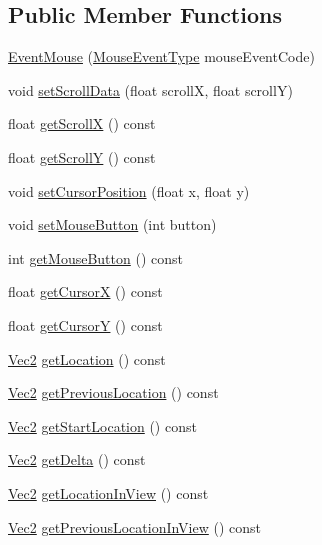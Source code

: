 \subsection*{Public Member Functions}
\begin{DoxyCompactItemize}
\item 
\hyperlink{classEventMouse_a7b964fea12b1e49f3fd13852be60d841}{Event\+Mouse} (\hyperlink{classEventMouse_a6a96ce5df8674cbaf01b74d2f17f213c}{Mouse\+Event\+Type} mouse\+Event\+Code)
\item 
void \hyperlink{classEventMouse_a8fb8c094794f11764abac87bb336e2a7}{set\+Scroll\+Data} (float scrollX, float scrollY)
\item 
float \hyperlink{classEventMouse_a6bca76b62d710a7eadfea9d38ef83597}{get\+ScrollX} () const
\item 
float \hyperlink{classEventMouse_ad0670c5295d1972f2b9ccb85d9d23849}{get\+ScrollY} () const
\item 
void \hyperlink{classEventMouse_ae379cb198545104ef7c79a6599213f99}{set\+Cursor\+Position} (float x, float y)
\item 
void \hyperlink{classEventMouse_ad260eadf10819c3933dc2622952e83a3}{set\+Mouse\+Button} (int button)
\item 
int \hyperlink{classEventMouse_ac1f35c4723f32dbe0c8ccfcb8cc74e54}{get\+Mouse\+Button} () const
\item 
float \hyperlink{classEventMouse_a27e8c8d55e83a9ddbdd7bffcf7c865b5}{get\+CursorX} () const
\item 
float \hyperlink{classEventMouse_af63042e92d51480cdc990360eb4e1166}{get\+CursorY} () const
\item 
\hyperlink{classVec2}{Vec2} \hyperlink{classEventMouse_a3ee0ff253fcf6914a5fdeb9b5c18f2b2}{get\+Location} () const
\item 
\hyperlink{classVec2}{Vec2} \hyperlink{classEventMouse_a3efc2e751febf59f3068305f90cb1acc}{get\+Previous\+Location} () const
\item 
\hyperlink{classVec2}{Vec2} \hyperlink{classEventMouse_a9fdfb69f542e2f9e879db6552e8f656a}{get\+Start\+Location} () const
\item 
\hyperlink{classVec2}{Vec2} \hyperlink{classEventMouse_abda7f9a6569febd5041d4efd7fca35e6}{get\+Delta} () const
\item 
\hyperlink{classVec2}{Vec2} \hyperlink{classEventMouse_ae349cda326d1f48848a8b8f161fe66ed}{get\+Location\+In\+View} () const
\item 
\hyperlink{classVec2}{Vec2} \hyperlink{classEventMouse_af6c5fce01a5275995b993bd4f315ab60}{get\+Previous\+Location\+In\+View} () const

\end{DoxyCompactItemize}
